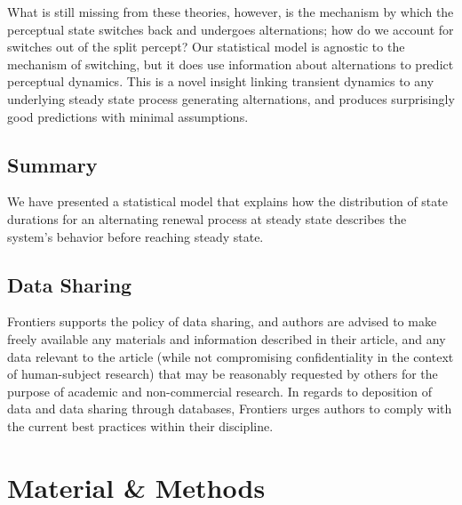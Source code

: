 \documentclass{frontiersSCNS} %
\begin{document}
What is still missing from these theories, however, is the mechanism by which the perceptual state switches back and undergoes alternations; how do we account for switches out of the split percept? Our statistical model is agnostic to the mechanism of switching, but it does use information about alternations to predict perceptual dynamics. This is a novel insight linking transient dynamics to any underlying steady state process generating alternations, and produces surprisingly good predictions with minimal assumptions.




\subsection{Summary}
We have presented a statistical model that explains how the distribution of state durations for an alternating renewal process at steady state describes the system's behavior before reaching steady state. 

\subsection{Data Sharing}

Frontiers supports the policy of data sharing, and authors are advised to make freely available any materials and information described in their article, and any data relevant to the article (while not compromising confidentiality in the context of human-subject research) that may be reasonably requested by others for the purpose of academic and non-commercial research. In regards to deposition of data and data sharing through databases, Frontiers urges authors to comply with the current best practices within their discipline.

\section{Material \& Methods}
\end{document}
